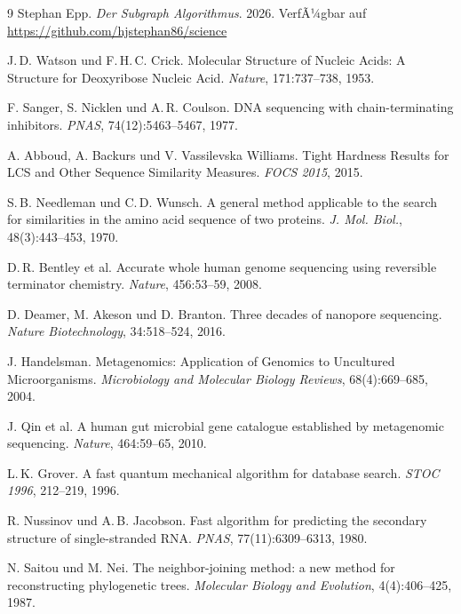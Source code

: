 ﻿\documentclass[a4paper,12pt]{article}
\theoremstyle{definition}
\begin{document}
\begin{thebibliography}{9}
    Stephan Epp.
    \textit{Der Subgraph Algorithmus}. 2026. VerfÃ¼gbar auf
    \url{https://github.com/hjstephan86/science}

    J.\,D. Watson und F.\,H.\,C. Crick.
    Molecular Structure of Nucleic Acids: A Structure for Deoxyribose
    Nucleic Acid.
    \textit{Nature}, 171:737--738, 1953.
    
    F. Sanger, S. Nicklen und A.\,R. Coulson.
    DNA sequencing with chain-terminating inhibitors.
    \textit{PNAS}, 74(12):5463--5467, 1977.
    
    A. Abboud, A. Backurs und V. Vassilevska Williams.
    Tight Hardness Results for LCS and Other Sequence Similarity Measures.
    \textit{FOCS 2015}, 2015.
    
    S.\,B. Needleman und C.\,D. Wunsch.
    A general method applicable to the search for similarities in the
    amino acid sequence of two proteins.
    \textit{J. Mol. Biol.}, 48(3):443--453, 1970.
    
    D.\,R. Bentley et al.
    Accurate whole human genome sequencing using reversible terminator
    chemistry.
    \textit{Nature}, 456:53--59, 2008.
    
    D. Deamer, M. Akeson und D. Branton.
    Three decades of nanopore sequencing.
    \textit{Nature Biotechnology}, 34:518--524, 2016.
    
    J. Handelsman.
    Metagenomics: Application of Genomics to Uncultured Microorganisms.
    \textit{Microbiology and Molecular Biology Reviews}, 68(4):669--685, 2004.
    
    J. Qin et al.
    A human gut microbial gene catalogue established by metagenomic sequencing.
    \textit{Nature}, 464:59--65, 2010.
    
    L.\,K. Grover.
    A fast quantum mechanical algorithm for database search.
    \textit{STOC 1996}, 212--219, 1996.
    
    R. Nussinov und A.\,B. Jacobson.
    Fast algorithm for predicting the secondary structure of single-stranded RNA.
    \textit{PNAS}, 77(11):6309--6313, 1980.
    
    N. Saitou und M. Nei.
    The neighbor-joining method: a new method for reconstructing phylogenetic trees.
    \textit{Molecular Biology and Evolution}, 4(4):406--425, 1987.


\end{thebibliography}
\end{document}
